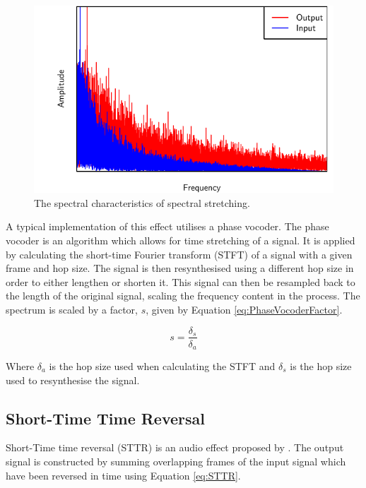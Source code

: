		\begin{figure}[h!]
			\centering
			\includegraphics{chapter3/Images/SpectralStretchingSpectrum.pdf}
			\caption{The spectral characteristics of spectral stretching.}
			\label{fig:SpectralStretching}
		\end{figure}

		A typical implementation of this effect utilises a phase vocoder. The phase vocoder is an algorithm which
		allows for time stretching of a signal. It is applied by calculating the short-time Fourier transform
		(STFT) of a signal with a given frame and hop size. The signal is then resynthesised using a different hop
		size in order to either lengthen or shorten it. This signal can then be resampled back to the length of the
		original signal, scaling the frequency content in the process. The spectrum is scaled by a factor, $s$,
		given by Equation \ref{eq:PhaseVocoderFactor}.

		\begin{equation}
			s = \frac{\delta_{s}}{\delta_{a}}
			\label{eq:PhaseVocoderFactor}
		\end{equation}

		Where $\delta_{a}$ is the hop size used when calculating the STFT and $\delta_{s}$ is the hop size used to
		resynthesise the signal.

	\subsection{Short-Time Time Reversal}
	\label{sec:Excitation-Methods-STTR}
		Short-Time time reversal (STTR) is an audio effect proposed by \citet{kim2014shorttime}. The output signal
		is constructed by summing overlapping frames of the input signal which have been reversed in time using
		Equation \ref{eq:STTR}.

